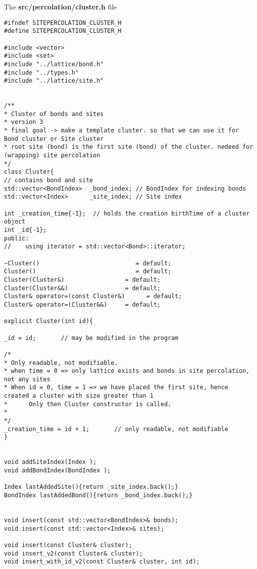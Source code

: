 
The \textbf{src/percolation/cluster.h} file

\begin{lstlisting}[style=CStyle]
#ifndef SITEPERCOLATION_CLUSTER_H
#define SITEPERCOLATION_CLUSTER_H

#include <vector>
#include <set>
#include "../lattice/bond.h"
#include "../types.h"
#include "../lattice/site.h"


/**
* Cluster of bonds and sites
* version 3
* final goal -> make a template cluster. so that we can use it for Bond cluster or Site cluster
* root site (bond) is the first site (bond) of the cluster. nedeed for (wrapping) site percolation
*/
class Cluster{
// contains bond and site
std::vector<BondIndex>  _bond_index; // BondIndex for indexing bonds
std::vector<Index>      _site_index; // Site index

int _creation_time{-1};  // holds the creation birthTime of a cluster object
int _id{-1};
public:
//    using iterator = std::vector<Bond>::iterator;

~Cluster()                           = default;
Cluster()                            = default;
Cluster(Cluster&)                 = default;
Cluster(Cluster&&)                = default;
Cluster& operator=(const Cluster&)      = default;
Cluster& operator=(Cluster&&)     = default;

explicit Cluster(int id){

_id = id;       // may be modified in the program

/*
* Only readable, not modifiable.
* when time = 0 => only lattice exists and bonds in site percolation, not any sites
* When id = 0, time = 1 => we have placed the first site, hence created a cluster with size greater than 1
*      Only then Cluster constructor is called.
*
*/
_creation_time = id + 1;       // only readable, not modifiable
}


void addSiteIndex(Index );
void addBondIndex(BondIndex );

Index lastAddedSite(){return _site_index.back();}
BondIndex lastAddedBond(){return _bond_index.back();}


void insert(const std::vector<BondIndex>& bonds);
void insert(const std::vector<Index>& sites);

void insert(const Cluster& cluster);
void insert_v2(const Cluster& cluster);
void insert_with_id_v2(const Cluster& cluster, int id);


\end{lstlisting}
